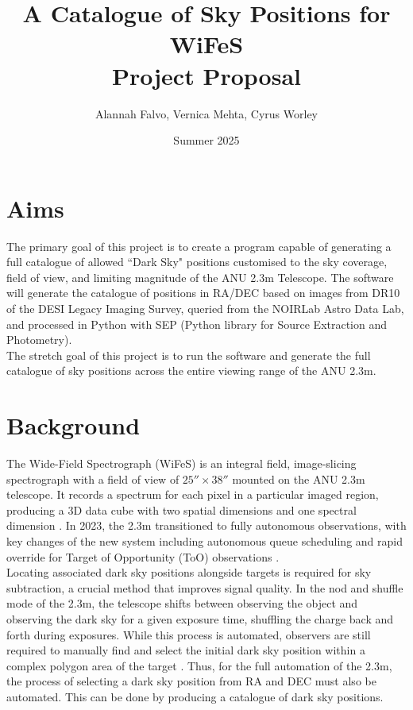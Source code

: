 \documentclass[11pt]{article}
\title{%
    \huge A Catalogue of Sky Positions for WiFeS \\
    \Large \textbf{Project Proposal}}
\author{Alannah Falvo, Vernica Mehta, Cyrus Worley}
\date{Summer 2025}
\begin{document}
\maketitle

\section{Aims}
The primary goal of this project is to create a program capable of generating a full catalogue of allowed ``Dark Sky" positions customised to the sky coverage, field of view, and limiting magnitude of the ANU 2.3m Telescope. The software will generate the catalogue of positions in RA/DEC based on images from DR10 of the DESI Legacy Imaging Survey, queried from the NOIRLab Astro Data Lab, and processed in Python with SEP (Python library for Source Extraction and Photometry)\cite{bertin_sextractor_1996}\cite{barbary_sep_2016}.\\

The stretch goal of this project is to run the software and generate the full catalogue of sky positions across the entire viewing range of the ANU 2.3m. 

\section{Background}

The Wide-Field Spectrograph (WiFeS) is an integral field, image-slicing spectrograph with a field of view of $25''\times38''$ mounted on the ANU 2.3m telescope. It records a spectrum for each pixel in a particular imaged region, producing a 3D data cube with two spatial dimensions and one spectral dimension \cite{dopita_wide_2007}.  In 2023, the 2.3m transitioned to fully autonomous observations, with key changes of the new system including autonomous queue scheduling and rapid override for Target of Opportunity (ToO) observations \cite{price_converting_2024}. \\

Locating associated dark sky positions alongside targets is required for sky subtraction, a crucial method that improves signal quality. In the nod and shuffle mode of the 2.3m, the telescope shifts between observing the object and observing the dark sky for a given exposure time, shuffling the charge back and forth during exposures. While this process is automated, observers are still required to manually find and select the initial dark sky position within a complex polygon area of the target \cite{dopita_wide_2007}. Thus, for the full automation of the 2.3m, the process of selecting a dark sky position from RA and DEC must also be automated. This can be done by producing a catalogue of dark sky positions. 
\end{document}
